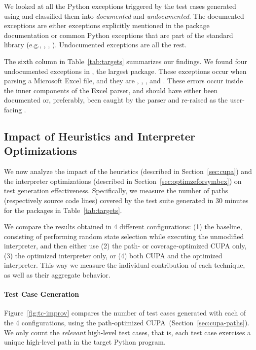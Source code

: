 We looked at all the Python exceptions triggered by the test cases generated using \chef and classified them into \emph{documented} and \emph{undocumented}.  The documented exceptions are either exceptions explicitly mentioned in the package documentation or common Python exceptions that are part of the standard library (e.g., , , ).  Undocumented exceptions are all the rest.

The sixth column in Table~\ref{tab:targets} summarizes our findings.  We found four undocumented exceptions in , the largest package.  These exceptions occur when parsing a Microsoft Excel file, and they are , , , and .  These errors occur inside the inner components of the Excel parser, and should have either been documented or, preferably, been caught by the parser and re-raised as the user-facing .

\subsection{Impact of \cupa Heuristics and Interpreter Optimizations}
\label{sec:sub:perf-cupa}

We now analyze the impact of the \cupa heuristics (described in Section~\ref{sec:cupa}) and the interpreter optimizations (described in Section~\ref{sec:optimzeforsymbex}) on test generation effectiveness.  Specifically, we measure the number of paths (respectively source code lines) covered by the test suite generated in 30 minutes for the packages in Table~\ref{tab:targets}.

We compare the results obtained in 4 different configurations: (1) the baseline, consisting of performing random state selection while executing the unmodified interpreter, and then either use (2) the path- or coverage-optimized CUPA only, (3) the optimized interpreter only, or (4) both CUPA and the optimized interpreter.  This way we measure the individual contribution of each technique, as well as their aggregate behavior.

\paragraph{Test Case Generation}

Figure~\ref{fig:tc-improv} compares the number of test cases generated with each of the 4 \chef configurations, using the path-optimized CUPA~(Section~\ref{sec:cupa-paths}).  We only count the \textit{relevant} high-level test cases, that is, each test case exercises a unique high-level path in the target Python program.

